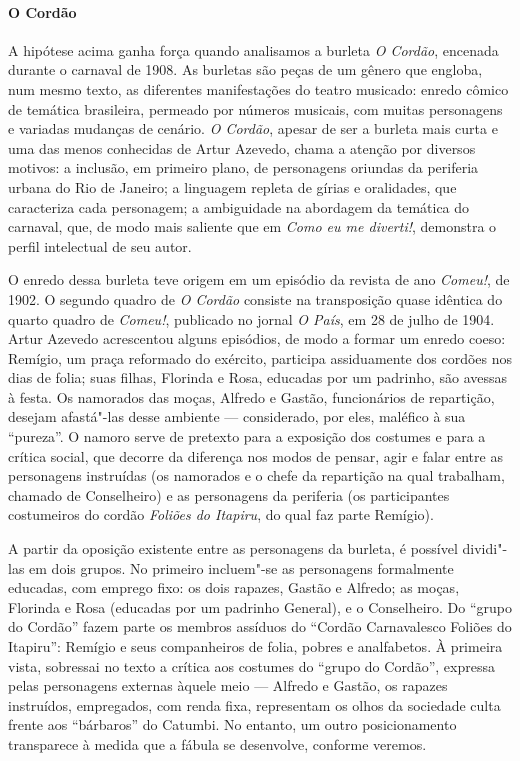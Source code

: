\paragraph{O Cordão}
A hipótese acima ganha força quando analisamos a burleta \textit{O
Cordão}, encenada durante o carnaval de 1908. As burletas são peças de
um gênero que engloba, num mesmo texto, as diferentes manifestações do
teatro musicado: enredo cômico de temática brasileira, permeado por
números musicais, com muitas personagens e variadas mudanças de
cenário. \textit{O Cordão}, apesar de ser a burleta mais curta e uma
das menos conhecidas de Artur Azevedo, chama a atenção por diversos
motivos: a inclusão, em primeiro plano, de personagens oriundas da
periferia urbana do Rio de Janeiro; a linguagem repleta de gírias e
oralidades, que caracteriza cada personagem; a ambiguidade na abordagem
da temática do carnaval, que, de modo mais saliente que em \textit{Como
eu me diverti!}, demonstra o perfil intelectual de seu autor.

O enredo dessa burleta teve origem em um episódio da revista de ano
\textit{Comeu!}, de 1902. O segundo quadro de \textit{O Cordão}
consiste na transposição quase idêntica do quarto quadro de
\textit{Comeu!}, publicado no jornal \textit{O País}, em 28 de julho de
1904. Artur Azevedo acrescentou alguns episódios, de modo a formar um
enredo coeso: Remígio, um praça reformado do exército, participa
assiduamente dos cordões nos dias de folia; suas filhas, Florinda e
Rosa, educadas por um padrinho, são avessas à festa. Os namorados das
moças, Alfredo e Gastão, funcionários de repartição, desejam afastá"-las
desse ambiente --- considerado, por eles, maléfico à sua “pureza”. O
namoro serve de pretexto para a exposição dos costumes e para a crítica
social, que decorre da diferença nos modos de pensar, agir e falar
entre as personagens instruídas (os namorados e o chefe da repartição
na qual trabalham, chamado de Conselheiro) e as personagens da
periferia (os participantes costumeiros do cordão \textit{Foliões do
Itapiru}, do qual faz parte Remígio).

A partir da oposição existente entre as personagens da burleta, é
possível dividi"-las em dois grupos. No primeiro incluem"-se as
personagens formalmente educadas, com emprego fixo: os dois rapazes,
Gastão e Alfredo; as moças, Florinda e Rosa (educadas por um padrinho
General), e o Conselheiro. Do “grupo do Cordão” fazem parte os
membros assíduos do “Cordão Carnavalesco Foliões do Itapiru”:
Remígio e seus companheiros de folia, pobres e analfabetos. À primeira
vista, sobressai no texto a crítica aos costumes do “grupo do Cordão”,
expressa pelas personagens externas àquele meio --- Alfredo e Gastão, os
rapazes instruídos, empregados, com renda fixa, representam os olhos da
sociedade culta frente aos “bárbaros” do Catumbi. No entanto, um outro
posicionamento transparece à medida que a fábula se desenvolve,
conforme veremos.

